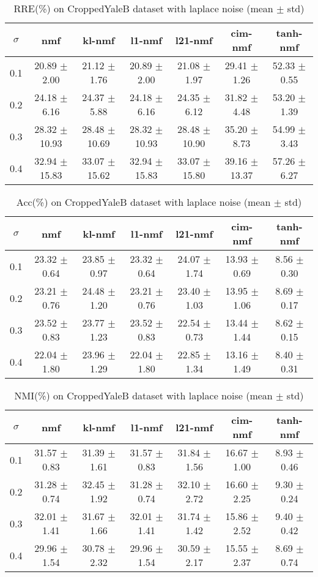 \documentclass{article} %
\begin{document}
\begin{table}[H]
\begin{tabular}{c|cccccc}$\sigma$ & nmf & kl-nmf & l1-nmf & l21-nmf & cim-nmf & tanh-nmf \\\hline
0.1 & 20.89 $\pm$ 2.00 & 21.12 $\pm$ 1.76 & 20.89 $\pm$ 2.00 & 21.08 $\pm$ 1.97 & 29.41 $\pm$ 1.26 & 52.33 $\pm$ 0.55 \\
0.2 & 24.18 $\pm$ 6.16 & 24.37 $\pm$ 5.88 & 24.18 $\pm$ 6.16 & 24.35 $\pm$ 6.12 & 31.82 $\pm$ 4.48 & 53.20 $\pm$ 1.39 \\
0.3 & 28.32 $\pm$ 10.93 & 28.48 $\pm$ 10.69 & 28.32 $\pm$ 10.93 & 28.48 $\pm$ 10.90 & 35.20 $\pm$ 8.73 & 54.99 $\pm$ 3.43 \\
0.4 & 32.94 $\pm$ 15.83 & 33.07 $\pm$ 15.62 & 32.94 $\pm$ 15.83 & 33.07 $\pm$ 15.80 & 39.16 $\pm$ 13.37 & 57.26 $\pm$ 6.27 \\
\end{tabular}\caption{
  RRE(\%) on CroppedYaleB dataset with laplace noise (mean $\pm$ std)
  \label{tab:RRE-CroppedYaleB-laplace}
}\end{table}
\begin{table}[H]
\begin{tabular}{c|cccccc}$\sigma$ & nmf & kl-nmf & l1-nmf & l21-nmf & cim-nmf & tanh-nmf \\\hline
0.1 & 23.32 $\pm$ 0.64 & 23.85 $\pm$ 0.97 & 23.32 $\pm$ 0.64 & 24.07 $\pm$ 1.74 & 13.93 $\pm$ 0.69 & 8.56 $\pm$ 0.30 \\
0.2 & 23.21 $\pm$ 0.76 & 24.48 $\pm$ 1.20 & 23.21 $\pm$ 0.76 & 23.40 $\pm$ 1.03 & 13.95 $\pm$ 1.06 & 8.69 $\pm$ 0.17 \\
0.3 & 23.52 $\pm$ 0.83 & 23.77 $\pm$ 1.23 & 23.52 $\pm$ 0.83 & 22.54 $\pm$ 0.73 & 13.44 $\pm$ 1.44 & 8.62 $\pm$ 0.15 \\
0.4 & 22.04 $\pm$ 1.80 & 23.96 $\pm$ 1.29 & 22.04 $\pm$ 1.80 & 22.85 $\pm$ 1.34 & 13.16 $\pm$ 1.49 & 8.40 $\pm$ 0.31 \\
\end{tabular}\caption{
  Acc(\%) on CroppedYaleB dataset with laplace noise (mean $\pm$ std)
  \label{tab:Acc-CroppedYaleB-laplace}
}\end{table}
\begin{table}[H]
\begin{tabular}{c|cccccc}$\sigma$ & nmf & kl-nmf & l1-nmf & l21-nmf & cim-nmf & tanh-nmf \\\hline
0.1 & 31.57 $\pm$ 0.83 & 31.39 $\pm$ 1.61 & 31.57 $\pm$ 0.83 & 31.84 $\pm$ 1.56 & 16.67 $\pm$ 1.00 & 8.93 $\pm$ 0.46 \\
0.2 & 31.28 $\pm$ 0.74 & 32.45 $\pm$ 1.92 & 31.28 $\pm$ 0.74 & 32.10 $\pm$ 2.72 & 16.60 $\pm$ 2.25 & 9.30 $\pm$ 0.24 \\
0.3 & 32.01 $\pm$ 1.41 & 31.67 $\pm$ 1.66 & 32.01 $\pm$ 1.41 & 31.74 $\pm$ 1.42 & 15.86 $\pm$ 2.52 & 9.40 $\pm$ 0.42 \\
0.4 & 29.96 $\pm$ 1.54 & 30.78 $\pm$ 2.32 & 29.96 $\pm$ 1.54 & 30.59 $\pm$ 2.17 & 15.55 $\pm$ 2.37 & 8.69 $\pm$ 0.74 \\
\end{tabular}\caption{
  NMI(\%) on CroppedYaleB dataset with laplace noise (mean $\pm$ std)
  \label{tab:NMI-CroppedYaleB-laplace}
}\end{table}
\end{document}
